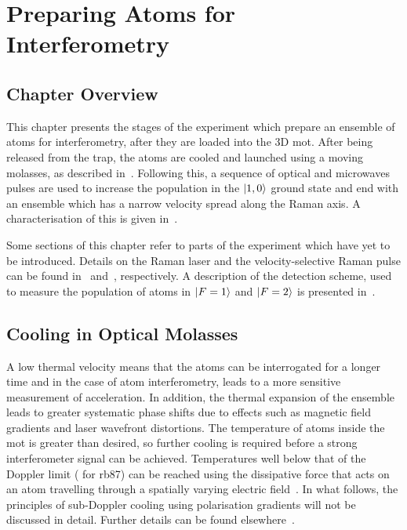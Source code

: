 \chapter{Preparing Atoms for Interferometry}\label{chap:atom_prep}
\section{Chapter Overview}
This chapter presents the stages of the experiment which prepare an
ensemble of atoms for interferometry, after they are loaded into the
3D \ac{mot}. After being released from the trap, the atoms are cooled
and launched using a moving molasses, as described
in~. Following this, a sequence of
optical and microwaves pulses are used to increase the population in
the \(\ket{1,0}\) ground state and end with an ensemble which has a
narrow velocity spread along the Raman axis. A characterisation of
this is given in~.
\par\noindent
Some sections of this chapter refer to parts of the experiment which
have yet to be introduced. Details on the Raman laser and the
velocity-selective Raman pulse can be found
in~
and~, respectively. A
description of the detection scheme, used to measure the population of
atoms in \(\ket{F=1}\) and \(\ket{F=2}\) is presented
in~.

\section{Cooling in Optical Molasses}\label{sec:optical_molasses}
A low thermal velocity means that the atoms can be interrogated for a
longer time and in the case of atom interferometry, leads to a more
sensitive measurement of acceleration. In addition, the thermal
expansion of the ensemble leads to greater systematic phase shifts due
to effects such as magnetic field gradients and laser wavefront
distortions. The temperature of atoms inside the \ac{mot} is greater
than desired, so further cooling is required before a strong
interferometer signal can be achieved. Temperatures well below that of
the Doppler limit ( for \ac{rb87}) can be
reached using the dissipative force that acts on an atom travelling
through a spatially varying electric field~\cite{Salomon1990}. In what follows, the principles of
sub-Doppler cooling using polarisation gradients will not be discussed
in detail. Further details can be found
elsewhere~\cite{Dalibard1989,Berg-Sorensent1992}. 

